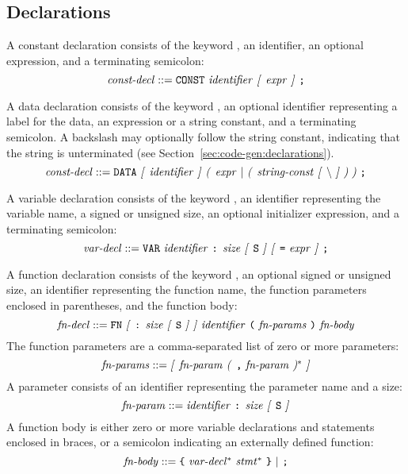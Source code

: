 \documentclass[10pt]{article}
\begin{document}
\subsection{Declarations}
\label{sec:syntax:declarations}

 A constant declaration consists of the
keyword , an identifier, an optional expression, and a
terminating semicolon:
%
$$\mbox{\textit{const-decl}} ::= \mbox{\texttt{CONST} \ensuremath{\mbox{\textit{identifier}}}
  \textit{[} \ensuremath{\mbox{\textit{expr}}} \textit{]} \texttt{;}}$$

 A data declaration consists of the keyword
, an optional identifier representing a label for the data,
an expression or a string constant, and a terminating semicolon.  A
backslash may optionally follow the string constant, indicating that
the string is unterminated (see
Section~\ref{sec:code-gen:declarations}).
%
$$\nonterm{const-decl} ::= \mbox{\kwd{DATA} \opt{\nonterm{identifier}}
  \group{\nonterm{expr} $|$ \group{\nonterm{string-const} \opt{\bs}}}
  \kwd{;}}$$

 A variable declaration consists of the
keyword , an identifier representing the variable name, a
signed or unsigned size, an optional initializer expression, and a
terminating semicolon:
%
$$\mbox{\textit{var-decl}} ::= \mbox{\texttt{VAR} \ensuremath{\mbox{\textit{identifier}}} \texttt{:}
  \ensuremath{\mbox{\textit{size}}} \textit{[} \texttt{S} \textit{]} \textit{[} \texttt{=} \ensuremath{\mbox{\textit{expr}}} \textit{]} \texttt{;}}$$

 A function declaration consists of the
keyword , an optional signed or unsigned size, an identifier
representing the function name, the function parameters enclosed in
parentheses, and the function body:
%
$$\mbox{\textit{fn-decl}} ::= \mbox{\texttt{FN} \textit{[} \texttt{:} \ensuremath{\mbox{\textit{size}}}
    \textit{[} \texttt{S} \textit{]} \textit{]} \ensuremath{\mbox{\textit{identifier}}} \texttt{(} \ensuremath{\mbox{\textit{fn-params}}}
  \texttt{)} \ensuremath{\mbox{\textit{fn-body}}}}$$
%
The function parameters are a comma-separated list of zero or more
parameters:
%
$$\mbox{\textit{fn-params}} ::= \mbox{\textit{[} \ensuremath{\mbox{\textit{fn-param}}} \textit{(} \texttt{,}
    \ensuremath{\mbox{\textit{fn-param}}} \textit{)}$^*$ \textit{]}}$$
%
A parameter consists of an identifier representing the parameter name
and a size:
%
$$\mbox{\textit{fn-param}} ::= \mbox{\ensuremath{\mbox{\textit{identifier}}} \texttt{:}
  \ensuremath{\mbox{\textit{size}}} \textit{[} \texttt{S} \textit{]}}$$
%
A function body is either zero or more variable declarations and
statements enclosed in braces, or a semicolon indicating an externally
defined function:
%
$$\mbox{\textit{fn-body}} ::= \mbox{\texttt{\{} \ensuremath{\mbox{\textit{var-decl}}}$^*$
  \ensuremath{\mbox{\textit{stmt}}}$^*$ \texttt{\}} $|$ \texttt{;}}$$
\end{document}
